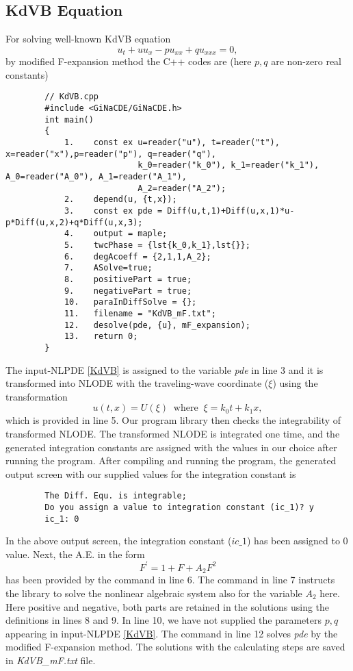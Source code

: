 \documentclass[prd,aps,floats,showkeys,nofootinbib,notitlepage]{revtex4-2}
\begin{document}
	\subsection{KdVB Equation}
	For solving well-known KdVB equation \cite{kdvb}
	\begin{equation}\label{KdVB}
		{u_t} + u{u_x} - p{u_{xx}} + q{u_{xxx}} = 0,
	\end{equation}
	by modified F-expansion method the C++ codes are (here $p,q$ are non-zero real constants)\\
	\begin{verbatim}
		// KdVB.cpp
		#include <GiNaCDE/GiNaCDE.h>
		int main()
		{
			1.    const ex u=reader("u"), t=reader("t"), x=reader("x"),p=reader("p"), q=reader("q"),
			               k_0=reader("k_0"), k_1=reader("k_1"), A_0=reader("A_0"), A_1=reader("A_1"), 
			               A_2=reader("A_2");   
			2.    depend(u, {t,x});
			3.    const ex pde = Diff(u,t,1)+Diff(u,x,1)*u-p*Diff(u,x,2)+q*Diff(u,x,3);
			4.    output = maple;  
			5.    twcPhase = {lst{k_0,k_1},lst{}};
			6.    degAcoeff = {2,1,1,A_2};
			7.    ASolve=true;
			8.    positivePart = true; 
			9.    negativePart = true;
			10.   paraInDiffSolve = {};
			11.   filename = "KdVB_mF.txt";
			12.   desolve(pde, {u}, mF_expansion);
			13.   return 0;
		}
	\end{verbatim}
	The input-NLPDE \eqref{KdVB} is assigned to the variable {\em pde} in line 3 and it is transformed into NLODE with the traveling-wave coordinate ($\xi$) using the transformation 
	\begin{equation}\label{KdVB_twtrans}
		u(t,x)=U(\xi)\;\;\text{where}\;\;\xi=k_0t+k_1x,
	\end{equation}
	which is provided in line 5.
	Our program library then checks the integrability of transformed NLODE. The transformed NLODE is integrated one time, and the generated integration constants are assigned with the values in our choice after running the program. After compiling and running the program, the generated output screen with our supplied values for the integration constant is
	\begin{verbatim}
		The Diff. Equ. is integrable;
		Do you assign a value to integration constant (ic_1)? y
		ic_1: 0
	\end{verbatim}
	In the above output screen, the integration constant ($ic\_1$) has been assigned to $0$ value.
	Next, the A.E. in the form 
	\begin{equation}\label{KdVBAE}
		F^{\prime}=1+F+A_2F^2
	\end{equation}
	has been provided by the command in line 6. The command in line 7 instructs the library to solve the nonlinear algebraic system also for the variable $A_2$ here.
	Here positive and negative, both parts are retained in the solutions using the definitions in lines 8 and 9. In line 10, we have not supplied the parameters $p,q$ appearing in input-NLPDE \eqref{KdVB}.
	The command in line 12 solves {\em pde} by the modified F-expansion method. 
	The solutions with the calculating steps are saved in {\em KdVB\_mF.txt} file.
	
\end{document}
